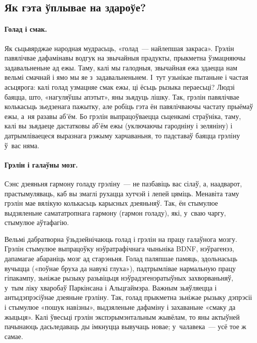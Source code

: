 \subsection{Як гэта ўплывае на здароўе?}

\paragraph{Голад і смак.}
Як сьцьвярджае народная мудрасьць, «голад~--- найлепшая закраса». Грэлін павялічвае дафамінавы водгук на звычайныя прадукты, прыкметна ўзмацняючы задавальненьне ад ежы. Таму, калі мы галодныя, звычайная ежа здаецца нам вельмі смачнай і ямо мы яе з~задавальненьнем. І~тут узьнікае пытаньне і частая асьцярога: калі голад узмацняе смак ежы, ці ёсьць рызыка пераесьці? Людзі баяцца, што, «нагуляўшы апэтыт», яны зьядуць лішку. Так, грэлін павялічвае колькасьць зьедзенага пажытку, але робіць гэта ён павялічваючы частату прыёмаў ежы, а~ня разавы аб'ём. Бо грэлін выпрацоўваецца сьценкамі страўніка, таму, калі вы зьядаеце дастатковы аб'ём ежы (уключаючы гародніну і зеляніну) і датрымліваецеся выразнага рэжыму харчаваньня, то падставаў баяцца грэліну ў~вас няма.

\paragraph{Грэлін і галаўны мозг.}
Сэнс дзеяньня гармону голаду грэліну~--- не пазбавіць вас сілаў, а, наадварот, прастымуляваць, каб вы змаглі рухацца хутчэй і лепей цяміць. Менавіта таму грэлін мае вялікую колькасьць карысных дзеяньняў. Так, ён стымулюе выдзяленьне самататропнага гармону (гармон голаду), які, у~сваю чаргу, стымулюе аўтафагію.

Вельмі дабратворна ўзьдзейнічаюць голад і грэлін на працу галаўнога мозгу. Грэлін стымулюе выпрацоўку нэўратрафічнага чыньніка BDNF, нэўрагенэз, дапамагае абараніць мозг ад старэньня. Голад паляпшае памяць, здольнасьць вучыцца («поўнае бруха да навукі глуха»), падтрымлівае нармальную працу гіпакампу, зьніжае рызыку разьвіцьця нэўрадэгенэратыўных захворваньняў, у~тым ліку хваробаў Паркінсана і Альцгаймэра. Важным зьяўляецца і антыдэпрэсіўнае дзеяньне грэліну. Так, голад прыкметна зьніжае рызыку дэпрэсіі і стымулюе «пошук навізны», выдзяленьне дафаміну і захаваньне «смаку да жыцьця». Калі ўвесьці грэлін экспэрымэнтальным жывёлам, то яны актыўней пачынаюць дасьледаваць ды імкнуцца вывучаць новае; у~чалавека~--- усё тое ж самае.

